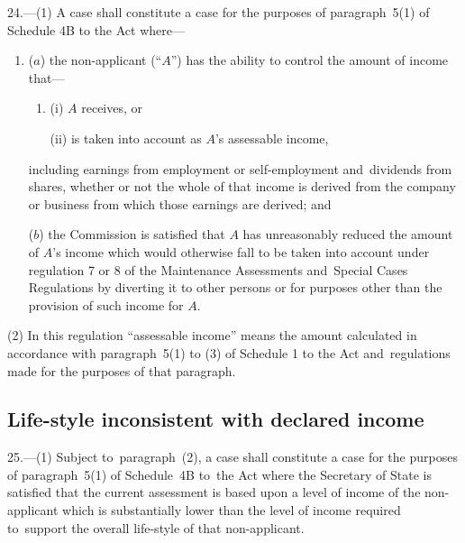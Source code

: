 \documentclass[12pt,a4paper]{article}
\begin{document}
24.---(1)  A case shall constitute a case for the purposes of paragraph~5(1) of Schedule 4B to the Act where—
\begin{enumerate}\item[]
($a$) the non-applicant (“$A$”) has the ability to control the amount of income that—
\begin{enumerate}\item[]
(i) $A$ receives, or

(ii) is taken into account as $A$’s assessable income,
\end{enumerate}
including earnings from employment or self-employment and~dividends from shares, whether or not the whole of that income is derived from the company or business from which those earnings are derived; and

($b$) the Commission is satisfied that $A$ has unreasonably reduced the amount of $A$’s income which would otherwise fall to be taken into account under regulation 7 or 8 of the Maintenance Assessments and~Special Cases Regulations by diverting it to other persons or for purposes other than the provision of such income for $A$.
\end{enumerate}

(2) In this regulation “assessable income” means the amount calculated in accordance with paragraph~5(1) to (3) of Schedule 1 to the Act and~regulations made for the purposes of that paragraph.


\subsection[25. Life-style inconsistent with declared income]{Life-style inconsistent with declared income}

25.—(1) Subject to~paragraph~(2), a case shall constitute a case for the purposes of paragraph~5(1) of Schedule~4B to~the Act where the Secretary of State is satisfied that the current 
assessment is based upon a level of income of the non-applicant which is substantially lower than the level of income required to~support the overall life-style of that non-applicant.

%
%
\end{document}
